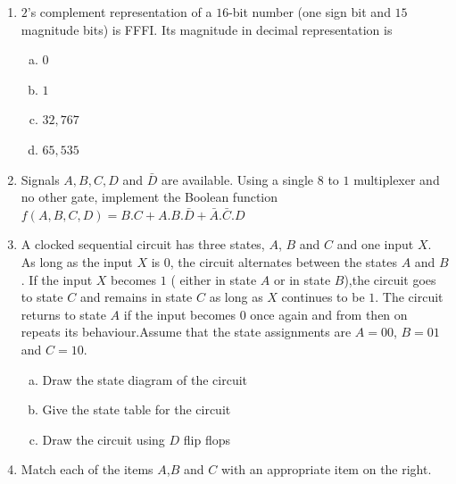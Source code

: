 \documentclass[journal,12pt,twocolumn]{IEEEtran}
\begin{document}
\begin{enumerate}
\begin{enumerate}[(a)]
\end{enumerate}

\item $2$'s complement representation of a $16$-bit number (one sign bit and $15$ magnitude bits) is FFFI. Its magnitude in decimal representation is


\begin{enumerate}[(a)]
 
\item $
0
$

\item $
1
$

\item $
32,767
$

\item $
65, 535
$


\end{enumerate}

\item Signals $A,B,C,D$ and $\bar{D}$ are available. Using a single $8$ to $1$ multiplexer and no other gate, implement the Boolean function $f(A,B,C,D)=B.C + A.B.\bar{D} + \bar{A}.\bar{C}.D$


\item A clocked sequential circuit has three states, $A$, $B$ and $C$ and one input $X$. As long as the input $X$ is $0$, the circuit alternates between the states $A$ and $B$. If the input $X$ becomes $1$ ( either in state $A$ or in state $B$),the circuit goes to state $C$ and remains in state $C$ as long as $X$ continues to be $1$. The circuit returns to state $A$ if the input becomes $0$ once again and from then on repeats its behaviour.Assume that the state assignments are $A=00$, $B=01$ and $C=10$.

\begin{enumerate}[(a)]
 
\item Draw the state diagram of the circuit

\item Give the state table for the circuit

\item Draw the circuit using $D$ flip flops
\end{enumerate}

\item Match each of the items $A$,$B$ and $C$ with an appropriate item on the right. 

\begin{enumerate}[(a)]

\begin{multicols}{2}
 

\end{multicols}
\end{enumerate}
\end{enumerate}
\end{document}
